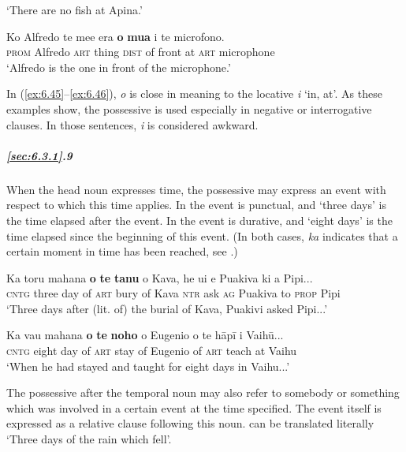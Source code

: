 \glt 
‘There are no fish at Apina.’ \textstyleExampleref{[R301.292]} 
\z

\ea\label{ex:6.46}
\gll Ko Alfredo te me{\ꞌ}e era \textbf{o} \textbf{mu{\ꞌ}a} i te microfono. \\
\textsc{prom} Alfredo \textsc{art} thing \textsc{dist} of front at \textsc{art} microphone \\

\glt
‘Alfredo is the one in front of the microphone.’ \textstyleExampleref{[R415.600]} 
\z

In (\ref{ex:6.45}–\ref{ex:6.46}), \textit{o} is close in meaning to the locative \textit{{\ꞌ}i} ‘in, at’. As these examples show, the possessive is used especially in negative or interrogative clauses. In those sentences, \textit{{\ꞌ}i} is considered awkward.

\subparagraph{\ref{sec:6.3.1}.9} When the head noun expresses time, the possessive may express an event with respect to which this time applies. In  the event is punctual, and ‘three days’ is the time elapsed after the event. In  the event is durative, and ‘eight days’ is the time elapsed since the beginning of this event. (In both cases, \textit{ka} indicates that a certain moment in time has been reached, see .)

\ea\label{ex:6.47}
\gll Ka toru mahana \textbf{o} \textbf{te} \textbf{tanu} o Kava, he {\ꞌ}ui e Puakiva ki a Pipi... \\
\textsc{cntg} three day of \textsc{art} bury of Kava \textsc{ntr} ask \textsc{ag} Puakiva to \textsc{prop} Pipi \\

\glt 
‘Three days after (lit. of) the burial of Kava, Puakivi asked Pipi...’ \textstyleExampleref{[R229.358]} 
\z

\ea\label{ex:6.48}
\gll Ka va{\ꞌ}u mahana \textbf{o} \textbf{te} \textbf{noho} o Eugenio o te hāpī {\ꞌ}i Vaihū... \\
\textsc{cntg} eight day of \textsc{art} stay of Eugenio of \textsc{art} teach at Vaihu \\

\glt
‘When he had stayed and taught for eight days in Vaihu...’ \textstyleExampleref{[R231.203]} 
\z

The possessive after the temporal noun may also refer to somebody or something which was involved in a certain event at the time specified. The event itself is expressed as a relative clause following this noun.  can be translated literally ‘Three days of the rain which fell’.

